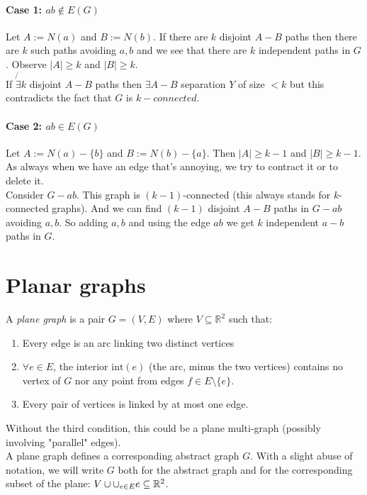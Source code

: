 \documentclass[11pt]{book}
\begin{document}
		\subsubsection{Case 1: $ab \notin E(G)$}
		Let $A := N(a)$ and $B := N(b)$.
		If there are $k$ disjoint $A-B$ paths then there are $k$ such paths avoiding $a,b$ and we see that there are $k$ independent paths in $G$.  Observe $|A| \geq k$ and $|B| \geq k$.\\
		
		If $\not{\exists} k$ disjoint $A-B$ paths then $\exists A-B$ separation $Y$ of size $< k$ but this contradicts the fact that $G$ is $k-connected$.
		
		\subsubsection{Case 2: $ab \in E(G)$}
		Let $A := N(a) - \{b\}$ and $B := N(b) - \{a\}$. Then $|A| \geq k -1$ and $|B| \geq k - 1$.\\
		
		As always when we have an edge that's annoying, we try to contract it or to delete it.\\
		
		Consider  $G - ab$. This graph is $(k-1)$-connected (this always stands for $k$-connected graphs). And we can find $(k-1)$ disjoint $A-B$ paths in $G - ab$ avoiding $a,b$. So adding $a,b$ and using the edge $ab$ we get $k$ independent $a-b$ paths in $G$. 
		
		
\chapter{Planar graphs}
		A \textit{plane graph} is a pair $G = (V,E)$ where $V \subseteq \mathbb{R}^2$ such that:
		\begin{enumerate}
			\item Every edge is an arc linking two distinct vertices
			\item $\forall e \in E$, the interior $\text{int}(e)$ (the arc, minus the two vertices) contains no vertex of $G$ nor any point from edges $f \in E \setminus \{ e \}$.
			\item Every pair of vertices is linked by at most one edge.
		\end{enumerate}
		Without the third condition, this could be a plane multi-graph (possibly involving "parallel" edges).\\
		
		A plane graph defines a corresponding abstract graph $G$. With a slight abuse of notation, we will write $G$ both for the abstract graph and for the corresponding subset of the plane: $V \cup \Large{\cup_{e \in E}} e \subseteq \mathbb{R}^2$.\\
		
\end{document}
